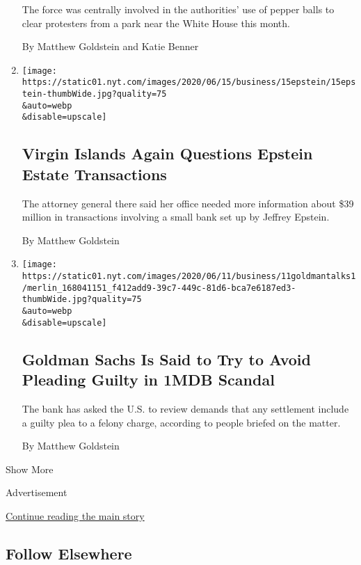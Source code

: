 \begin{enumerate}
  The force was centrally involved in the authorities' use of pepper
  balls to clear protesters from a park near the White House this month.

  By Matthew Goldstein and Katie Benner
\item
  \href{/2020/06/15/business/virgin-islands-jeffrey-epstein-bank.html}{}

  \texttt{[image: https://static01.nyt.com/images/2020/06/15/business/15epstein/15epstein-thumbWide.jpg?quality=75\\\&auto=webp\\\&disable=upscale]}

  \hypertarget{virgin-islands-again-questions-epstein-estate-transactions}{%
  \subsection{Virgin Islands Again Questions Epstein Estate
  Transactions}\label{virgin-islands-again-questions-epstein-estate-transactions}}

  The attorney general there said her office needed more information
  about \$39 million in transactions involving a small bank set up by
  Jeffrey Epstein.

  By Matthew Goldstein
\item
  \href{/2020/06/11/business/goldman-sachs-1mdb-malaysia.html}{}

  \texttt{[image: https://static01.nyt.com/images/2020/06/11/business/11goldmantalks1/merlin\_168041151\_f412add9-39c7-449c-81d6-bca7e6187ed3-thumbWide.jpg?quality=75\\\&auto=webp\\\&disable=upscale]}

  \hypertarget{goldman-sachs-is-said-to-try-to-avoid-pleading-guilty-in-1mdb-scandal}{%
  \subsection{Goldman Sachs Is Said to Try to Avoid Pleading Guilty in
  1MDB
  Scandal}\label{goldman-sachs-is-said-to-try-to-avoid-pleading-guilty-in-1mdb-scandal}}

  The bank has asked the U.S. to review demands that any settlement
  include a guilty plea to a felony charge, according to people briefed
  on the matter.

  By Matthew Goldstein
\end{enumerate}

Show More

Advertisement

\protect\hyperlink{after-mid2}{Continue reading the main story}

\hypertarget{follow-elsewhere}{%
\subsection{Follow Elsewhere}\label{follow-elsewhere}}

